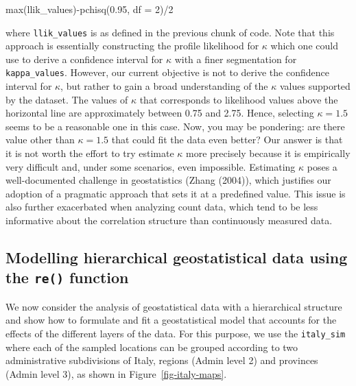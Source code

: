 \documentclass[
  letterpaper,
]{krantz}
\newenvironment{Shaded}{\begin{snugshade}}{\end{snugshade}}
\newcommand{\AttributeTok}[1]{\textcolor[rgb]{0.40,0.45,0.13}{#1}}
\newcommand{\DecValTok}[1]{\textcolor[rgb]{0.68,0.00,0.00}{#1}}
\newcommand{\FloatTok}[1]{\textcolor[rgb]{0.68,0.00,0.00}{#1}}
\newcommand{\FunctionTok}[1]{\textcolor[rgb]{0.28,0.35,0.67}{#1}}
\newcommand{\NormalTok}[1]{\textcolor[rgb]{0.00,0.23,0.31}{#1}}
\newcommand{\SpecialCharTok}[1]{\textcolor[rgb]{0.37,0.37,0.37}{#1}}
\begin{document}
\begin{Shaded}
\begin{Highlighting}[]
\FunctionTok{max}\NormalTok{(llik\_values)}\SpecialCharTok{{-}}\FunctionTok{pchisq}\NormalTok{(}\FloatTok{0.95}\NormalTok{, }\AttributeTok{df =} \DecValTok{2}\NormalTok{)}\SpecialCharTok{/}\DecValTok{2}
\end{Highlighting}
\end{Shaded}

where \texttt{llik\_values} is as defined in the previous chunk of code.
Note that this approach is essentially constructing the profile
likelihood for \(\kappa\) which one could use to derive a confidence
interval for \(\kappa\) with a finer segmentation for
\texttt{kappa\_values}. However, our current objective is not to derive
the confidence interval for \(\kappa\), but rather to gain a broad
understanding of the \(\kappa\) values supported by the dataset. The
values of \(\kappa\) that corresponds to likelihood values above the
horizontal line are approximately between 0.75 and 2.75. Hence,
selecting \(\kappa=1.5\) seems to be a reasonable one in this case. Now,
you may be pondering: are there value other than \(\kappa=1.5\) that
could fit the data even better? Our answer is that it is not worth the
effort to try estimate \(\kappa\) more precisely because it is
empirically very difficult and, under some scenarios, even impossible.
Estimating \(\kappa\) poses a well-documented challenge in geostatistics
(Zhang (2004)), which justifies our adoption of a pragmatic approach
that sets it at a predefined value. This issue is also further
exacerbated when analyzing count data, which tend to be less informative
about the correlation structure than continuously measured data.

\hypertarget{sec-add-re-glgm}{%
\subsection{\texorpdfstring{Modelling hierarchical geostatistical data
using the \texttt{re()}
function}{Modelling hierarchical geostatistical data using the re() function}}\label{sec-add-re-glgm}}

We now consider the analysis of geostatistical data with a hierarchical
structure and show how to formulate and fit a geostatistical model that
accounts for the effects of the different layers of the data. For this
purpose, we use the \texttt{italy\_sim} where each of the sampled
locations can be grouped according to two administrative subdivisions of
Italy, regions (Admin level 2) and provinces (Admin level 3), as shown
in Figure~\ref{fig-italy-maps}.
\end{document}
